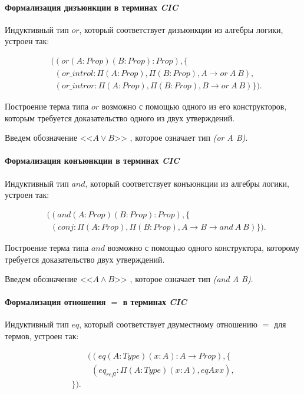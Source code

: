 \documentclass[12pt]{article}
\begin{document}
\paragraph{Формализация дизъюнкции в терминах \textit{CIC}}\mbox{}

Индуктивный тип $or$, который соответствует дизъюнкции из алгебры логики, устроен так:

\begin{align*}
& ((or(A:Prop)(B:Prop):Prop), \{ \\ 
& \ \ (or\_introl : \Pi(A:Prop), \Pi (B:Prop), A \xrightarrow{} or\ A\ B ), \\
& \ \ (or\_intror : \Pi(A:Prop), \Pi (B:Prop), B \xrightarrow{} or\ A\ B ) \}).
\end{align*}

Построение терма типа $or$ возможно с помощью одного из его конструкторов, которым требуется доказательство одного из двух утверждений.

Введем обозначение  <<$A \lor B$>> , которое означает тип 
\textit{(or A B)}.

\paragraph{Формализация конъюнкции в терминах \textit{CIC}}\mbox{}

Индуктивный тип $and$, который соответствует конъюнкции из алгебры логики, устроен так:

\begin{align*}
& ((and(A:Prop)(B:Prop):Prop), \{ \\ 
& \ \ (conj : \Pi(A:Prop), \Pi (B:Prop), A \xrightarrow{} B \xrightarrow{} and\ A\ B ) \}).
\end{align*}

Построение терма типа $and$ возможно с помощью одного конструктора, которому требуется доказательство двух утверждений.

Введем обозначение  <<$A \wedge B$>> , которое означает тип 
\textit{(and A B)}.

\paragraph{Формализация отношения $=$ в терминах \textit{CIC}}\mbox{}

Индуктивный тип $eq$, который соответствует двуместному отношению $=$ для термов, устроен так:

\begin{align*}
& ((eq (A : Type) (x : A): A \xrightarrow{} Prop), \{ \\ 
& \ \ (eq_{refl} : \Pi(A : Type) (x : A), eq A x x ), \\
 \}).
\end{align*}
\end{document}
